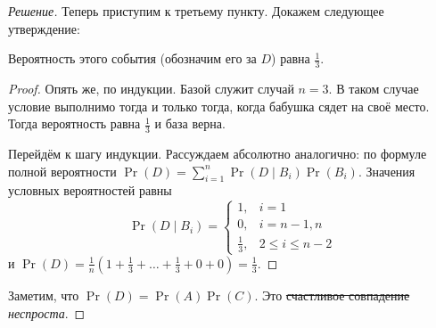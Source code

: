 \begin{proof}[Решение]
    Теперь приступим к третьему пункту. Докажем следующее утверждение:
    \begin{hypothesis}
        Вероятность этого события (обозначим его за \(D\)) равна \(\frac{1}{3}\).
    \end{hypothesis}
    \begin{proof}
        Опять же, по индукции. Базой служит случай \(n = 3\). В таком случае условие выполнимо тогда и только тогда, когда бабушка сядет на своё место. Тогда вероятность равна \(\frac{1}{3}\) и база верна.

        Перейдём к шагу индукции. Рассуждаем абсолютно аналогично: по формуле полной вероятности \(\Pr(D) = \sum\limits_{i = 1}^{n} \Pr(D \mid B_i)\Pr(B_i)\). Значения условных вероятностей равны
        \[\Pr(D \mid B_i) = \begin{cases}
        1, & i = 1 \\
        0, & i = n - 1, n \\
        \frac{1}{3}, & 2 \leq i \leq n - 2
        \end{cases}\]
        и \(\Pr(D) = \frac{1}{n}\left(1 + \frac{1}{3} + \ldots + \frac{1}{3} + 0 + 0\right) = \frac{1}{3}\).
    \end{proof}
    Заметим, что \(\Pr(D) = \Pr(A)\Pr(C)\). Это \sout{счастливое совпадение} \emph{неспроста}.
\end{proof}

